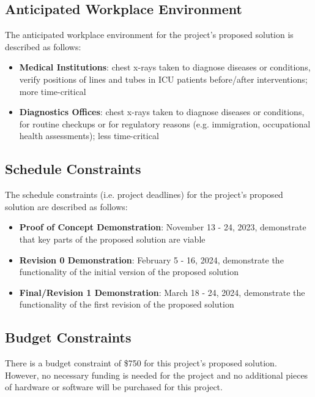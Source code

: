 \documentclass[12pt]{article}
\begin{document}
\subsection{Anticipated Workplace Environment}
The anticipated workplace environment for the project’s proposed solution is described as follows:
\begin{itemize}
    \item \textbf{Medical Institutions}: chest x-rays taken to diagnose diseases or conditions, verify positions of lines and tubes in ICU patients before/after interventions; more time-critical
    \item \textbf{Diagnostics Offices}: chest x-rays taken to diagnose diseases or conditions, for routine checkups or for regulatory reasons (e.g. immigration, occupational health assessments); less time-critical
\end{itemize}


\subsection{Schedule Constraints}
The schedule constraints (i.e. project deadlines) for the project’s proposed solution are described as follows:
\begin{itemize}
    \item \textbf{Proof of Concept Demonstration}: November 13 - 24, 2023, demonstrate that key parts of the proposed solution are viable
    \item \textbf{Revision 0 Demonstration}: February 5 - 16, 2024, demonstrate the functionality of the initial version of the proposed solution
    \item \textbf{Final/Revision 1 Demonstration}: March 18 - 24, 2024, demonstrate the functionality of the first revision of the proposed solution
\end{itemize}

\subsection{Budget Constraints}
There is a budget constraint of \$750 for this project's proposed solution. However, no necessary funding is needed for the project and no additional pieces of hardware or software will be purchased for this project. 
\end{document}
